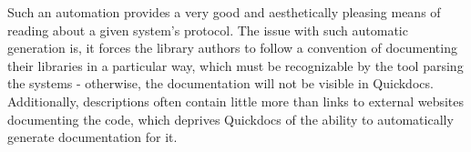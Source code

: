 Such an automation provides a very good and aesthetically pleasing means of reading about a given system's protocol. The issue with such automatic generation is, it forces the library authors to follow a convention of documenting their libraries in a particular way, which must be recognizable by the tool parsing the \ql{} systems - otherwise, the documentation will not be visible in Quickdocs. Additionally, \ql{} descriptions often contain little more than links to external websites documenting the code, which deprives Quickdocs of the ability to automatically generate documentation for it.